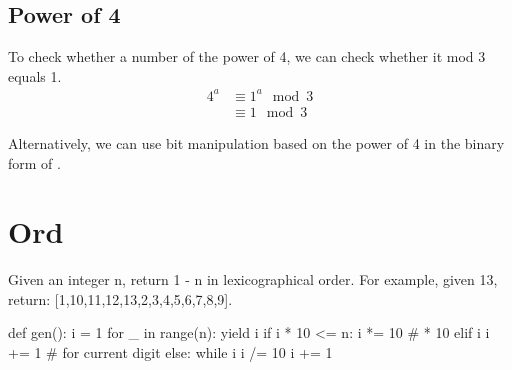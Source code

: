 \subsection{Power of 4}
To check whether a number of the power of 4, we can check whether it mod 3 equals 1.
\begin{align*}
4^a &\equiv 1^a\mod 3 \\
&\equiv 1 \mod 3
\end{align*}

Alternatively, we can use bit manipulation based on the power of 4 in the binary form of . 

\section{Ord}
 Given an integer n, return 1 - n in lexicographical order. For example, given 13, return: [1,10,11,12,13,2,3,4,5,6,7,8,9].

\begin{python}
def gen():
    i = 1
    for _ in range(n):
        yield i
        if i * 10 <= n:
            i *= 10  # * 10
        elif i %
            i += 1  # for current digit
        else:
            while i %
                i /= 10
            i += 1
\end{python}
